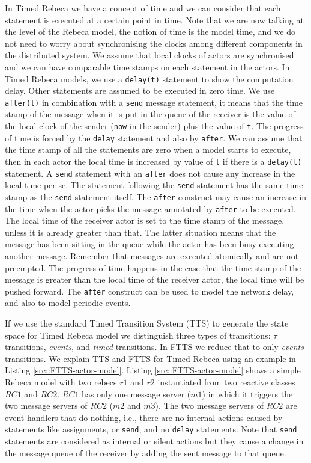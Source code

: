 In Timed Rebeca we have a concept of time and we can consider that each statement is executed at a certain point in time. Note that we are now talking at the level of the Rebeca model, the notion of time is the model time, and we do not need to worry about synchronising the clocks among different components in the distributed system. We assume that local clocks of actors are synchronised and we can have comparable time stamps on each statement in the actors.
%
In Timed Rebeca models, we use a \texttt{delay(t)} statement to show the computation delay. Other statements are assumed to be executed in zero time. We use  \texttt{after(t)} in combination with a \texttt{send} message statement, it means that the time stamp of the message when it is put in the queue of the receiver is the value of the local clock of the sender (\texttt{now} in the sender) plus the value of \texttt{t}.
The progress of time is forced by the \texttt{delay} statement and also by \texttt{after}. 
We can assume that the time stamp of all the statements are zero when a model starts to execute, then in each actor the local time is increased by value of \texttt{t} if there is a \texttt{delay(t)} statement.
A \texttt{send} statement with an  \texttt{after} does not cause any increase in the local time per se. The statement following the \texttt{send} statement has the same time stamp as the \texttt{send} statement itself.
The \texttt{after} construct may cause an increase in the time when the actor picks the message annotated by \texttt{after} to be executed. The local time of the receiver actor is set to the time stamp of the message, unless it is already greater than that.
The latter situation means that the message has been sitting in the queue while the actor has been busy executing another message.
Remember that messages are executed atomically and are not preempted.
%
The progress of time happens in the case that the time stamp of the message is greater than the local time of the receiver actor, the local time will be pushed forward.
%
The \texttt{after} construct can be used to model the network delay, and also to model periodic events.


If we use the standard Timed Transition System (TTS) to generate the state space for Timed Rebeca model we distinguish three types of transitions: $\tau$ transitions, \textit{events}, and \textit{timed} transitions.
In FTTS we reduce that to only \textit{events} transitions.
%
We explain TTS and FTTS for Timed Rebeca using an example in Listing \ref{src::FTTS-actor-model}.
Listing \ref{src::FTTS-actor-model} shows a simple Rebeca model with two rebecs $r1$ and $r2$ instantiated from two reactive classes $RC1$ and $RC2$.
$RC1$ has only one message server ($m1$) in which it triggers the two message servers of $RC2$ ($m2$ and $m3$).
The two message servers of $RC2$ are event handlers that do nothing, i.e., there are no internal actions caused by statements like assignments, or \texttt{send}, and no  \texttt{delay} statements. Note that \texttt{send} statements are considered as internal or silent actions but they cause a change in the message queue of the receiver by adding the sent message to that queue.
 

